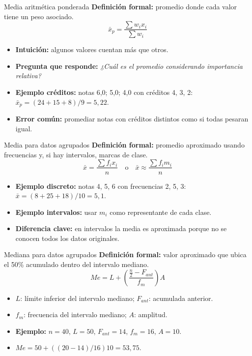 \documentclass[aspectratio=169,11pt]{beamer}
\newcommand{\pregunta}[1]{\textbf{Pregunta que responde:} \emph{#1}}
\newcommand{\errorcomun}[1]{\textbf{Error común:} #1}
\newcommand{\diferencia}[1]{\textbf{Diferencia clave:} #1}
\begin{document}
\begin{frame}{Media aritmética ponderada}
\textbf{Definición formal:} promedio donde cada valor tiene un peso asociado.
\[
\bar{x}_p=\frac{\sum w_i x_i}{\sum w_i}
\]
\begin{itemize}
  \item \textbf{Intuición:} algunos valores cuentan más que otros.
  \item \pregunta{¿Cuál es el promedio considerando importancia relativa?}
  \item \textbf{Ejemplo créditos:} notas 6,0; 5,0; 4,0 con créditos 4, 3, 2: $\bar{x}_p=(24+15+8)/9=5{,}22$.
  \item \errorcomun{promediar notas con créditos distintos como si todas pesaran igual.}
\end{itemize}
\end{frame}

\begin{frame}{Media para datos agrupados}
\textbf{Definición formal:} promedio aproximado usando frecuencias y, si hay intervalos, marcas de clase.
\[
\bar{x}=\frac{\sum f_i x_i}{n}\quad\text{o}\quad \bar{x}\approx\frac{\sum f_i m_i}{n}
\]
\begin{itemize}
  \item \textbf{Ejemplo discreto:} notas 4, 5, 6 con frecuencias 2, 5, 3: $\bar{x}=(8+25+18)/10=5{,}1$.
  \item \textbf{Ejemplo intervalos:} usar $m_i$ como representante de cada clase.
  \item \diferencia{en intervalos la media es aproximada porque no se conocen todos los datos originales.}
\end{itemize}
\end{frame}

\begin{frame}{Mediana para datos agrupados}
\textbf{Definición formal:} valor aproximado que ubica el 50\% acumulado dentro del intervalo mediano.
\[
Me=L+\left(\frac{\frac{n}{2}-F_{ant}}{f_m}\right)A
\]
\begin{itemize}
  \item $L$: límite inferior del intervalo mediano; $F_{ant}$: acumulada anterior.
  \item $f_m$: frecuencia del intervalo mediano; $A$: amplitud.
  \item \textbf{Ejemplo:} $n=40$, $L=50$, $F_{ant}=14$, $f_m=16$, $A=10$.
  \item $Me=50+((20-14)/16)10=53{,}75$.
\end{itemize}
\end{frame}
\end{document}
